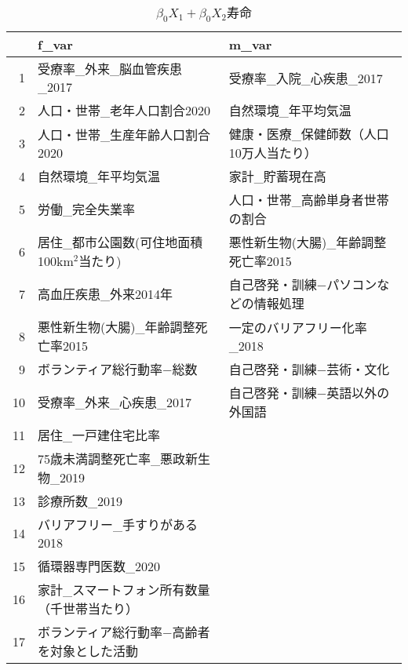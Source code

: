 \begin{table}[ht]
\centering
\begingroup\tiny
\begin{tabular}{rll}
  \hline
 & f\_var & m\_var \\ 
  \hline
1 & 受療率\_外来\_脳血管疾患\_2017 & 受療率\_入院\_心疾患\_2017 \\ 
  2 & 人口・世帯\_老年人口割合2020 & 自然環境\_年平均気温 \\ 
  3 & 人口・世帯\_生産年齢人口割合2020 & 健康・医療\_保健師数（人口10万人当たり） \\ 
  4 & 自然環境\_年平均気温 & 家計\_貯蓄現在高 \\ 
  5 & 労働\_完全失業率 & 人口・世帯\_高齢単身者世帯の割合 \\ 
  6 & 居住\_都市公園数(可住地面積100km$^2$当たり) & 悪性新生物(大腸)\_年齢調整死亡率2015 \\ 
  7 & 高血圧疾患\_外来2014年 & 自己啓発・訓練−パソコンなどの情報処理 \\ 
  8 & 悪性新生物(大腸)\_年齢調整死亡率2015 & 一定のバリアフリー化率\_2018 \\ 
  9 & ボランティア総行動率−総数 & 自己啓発・訓練−芸術・文化 \\ 
  10 & 受療率\_外来\_心疾患\_2017 & 自己啓発・訓練−英語以外の外国語 \\ 
  11 & 居住\_一戸建住宅比率 &  \\ 
  12 & 75歳未満調整死亡率\_悪政新生物\_2019 &  \\ 
  13 & 診療所数\_2019 &  \\ 
  14 & バリアフリー\_手すりがある2018 &  \\ 
  15 & 循環器専門医数\_2020 &  \\ 
  16 & 家計\_スマートフォン所有数量（千世帯当たり） &  \\ 
  17 & ボランティア総行動率−高齢者を対象とした活動 &  \\ 
   \hline
\end{tabular}
\endgroup
\caption[bbb]{$\beta_0 X_1+\beta_0 X_2$寿命} 
\label{UsedVariable}
\end{table}
